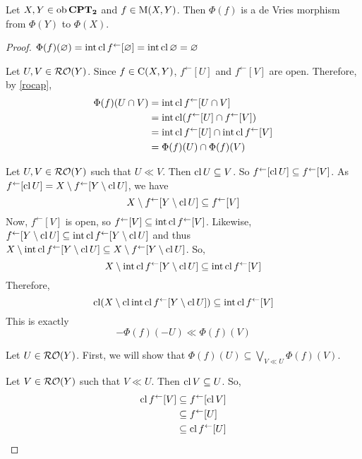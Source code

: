 \begin{theorem}
	\label{phim}
	Let \( X,Y \in \operatorname{ob}{\bf{CPT}_\mathbf{2}} \) and \( f \in \operatorname{M}(X,Y) \).  Then \( \Phi(f) \) is a de Vries morphism from \( \Phi(Y) \) to \( \Phi(X) \).
\end{theorem}
\begin{proof}
	\leavevmode
		\( \Phi(f)(\varnothing) = \operatorname{int}\operatorname{cl}{f^{\leftarrow}[\varnothing]} = \operatorname{int}\operatorname{cl}{\varnothing} = \varnothing \)
	
		Let \( U,V \in \operatorname{\mathcal{RO}}(Y) \).  Since \( f \in \operatorname{C}(X,Y) \), \( f^{\leftarrow}[U] \) and \( f^{\leftarrow}[V] \) are open.  Therefore, by \ref{rocap},
		\begin{align*}
			\Phi(f)(U \cap V) &= \operatorname{int}\operatorname{cl}{f^{\leftarrow}[U \cap V]}\\
			&= \operatorname{int}\operatorname{cl}(f^{\leftarrow}[U] \cap f^{\leftarrow}[V])\\
			&= \operatorname{int}\operatorname{cl}{f^{\leftarrow}[U]} \cap \operatorname{int}\operatorname{cl}{f^{\leftarrow}[V]}\\
			&= \Phi(f)(U) \cap \Phi(f)(V)
		\end{align*}
	
		Let \( U,V \in \operatorname{\mathcal{RO}}(Y) \) such that \( U \ll V \).  Then \( \operatorname{cl}{U} \subseteq V \).  So \( f^\leftarrow[\operatorname{cl}{U}] \subseteq f^\leftarrow[V] \).  As \( f^\leftarrow[\operatorname{cl}{U}] = X \setminus f^\leftarrow[Y \setminus \operatorname{cl}{U}] \), we have
		\[ X \setminus f^\leftarrow[Y \setminus \operatorname{cl}{U}] \subseteq f^\leftarrow[V] \]
		Now, \( f^\leftarrow[V] \) is open, so \( f^\leftarrow[V] \subseteq \operatorname{int}\operatorname{cl}{f^\leftarrow[V]} \).  Likewise, \( f^\leftarrow[Y \setminus \operatorname{cl}{U}] \subseteq \operatorname{int}\operatorname{cl}{f^\leftarrow[Y \setminus \operatorname{cl}{U}]} \) and thus \( X \setminus \operatorname{int}\operatorname{cl}{f^\leftarrow[Y \setminus \operatorname{cl}{U}]} \subseteq X \setminus f^\leftarrow[Y \setminus \operatorname{cl}{U}] \).  So,
		\[ X \setminus \operatorname{int}\operatorname{cl}{f^\leftarrow[Y \setminus \operatorname{cl}{U}]} \subseteq \operatorname{int}\operatorname{cl}{f^\leftarrow[V]} \]
		Therefore,
		\[ \operatorname{cl}(X \setminus \operatorname{cl}\operatorname{int}\operatorname{cl}{f^\leftarrow[Y \setminus \operatorname{cl}{U}]}) \subseteq \operatorname{int}\operatorname{cl}{f^\leftarrow[V]} \]
		This is exactly
		\[ -\Phi(f)(-U) \ll \Phi(f)(V) \]
	
		Let \( U \in \operatorname{\mathcal{RO}}(Y) \).  First, we will show that \( \Phi(f)(U) \subseteq \bigvee_{V \ll U} \Phi(f)(V) \).
		
		Let \( V \in \operatorname{\mathcal{RO}}(Y) \) such that \( V \ll U \).  Then \( \operatorname{cl}{V} \subseteq U \).  So,
		\begin{align*}
			\operatorname{cl}{f^\leftarrow[V]} &\subseteq f^\leftarrow[\operatorname{cl}{V}] \\
			&\subseteq f^\leftarrow[U] \\
			&\subseteq \operatorname{cl}{f^\leftarrow[U]}
		\end{align*}
		

\end{proof}

